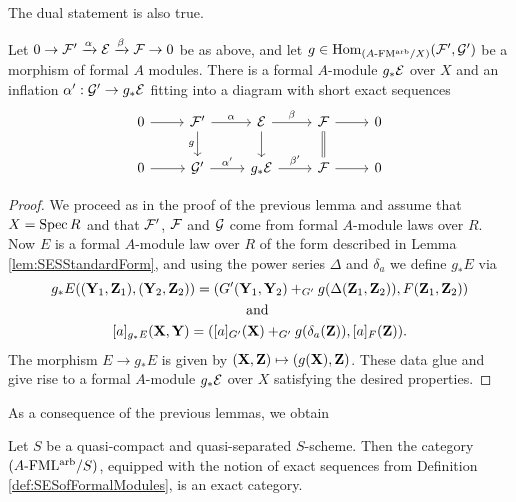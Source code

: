 \documentclass[../main.tex]{subfiles}
\begin{document}
The dual statement is also true. 
\begin{lem}
  Let $0 \to \mathcal{F}' \xrightarrow{\alpha} \mathcal{E} \xrightarrow{\beta} \mathcal{F} \to 0$ be as above, and let
  $g \in \operatorname{Hom}_{{({A}\text-\allowbreak\mathrm{FM^{arb}}/{X})}}(\mathcal{F}', \mathcal{G}')$ be a morphism of formal 
  $A$ modules. There is a formal $A$-module $g_*\mathcal{E}$ over $X$ and an
  inflation $\alpha':\mathcal{G}' \to g_*\mathcal{E}$ fitting into a diagram with short 
  exact sequences
  \begin{equation*}
    \begin{tikzcd}[ampersand replacement=\&]
    	0 \& {\cF'} \& \cE \& \cF \& 0 \\
    	0 \& {\cG'} \& {g_* \cE} \& \cF \& 0
    	\arrow[from=1-1, to=1-2]
    	\arrow["\alpha", from=1-2, to=1-3]
    	\arrow["g"', from=1-2, to=2-2]
    	\arrow["\beta", from=1-3, to=1-4]
    	\arrow[from=1-3, to=2-3]
    	\arrow[from=1-4, to=1-5]
    	\arrow[Rightarrow, no head, from=1-4, to=2-4]
    	\arrow[from=2-1, to=2-2]
    	\arrow["{\alpha'}", from=2-2, to=2-3]
    	\arrow["{\beta'}", from=2-3, to=2-4]
    	\arrow[from=2-4, to=2-5]
    \end{tikzcd}
  \end{equation*}
\begin{proof}
  We proceed as in the proof of the previous lemma and assume that 
  $X = \operatorname{Spec} R$ and that $\mathcal{F}'$, $\mathcal{F}$ and $\mathcal{G}$ come from formal $A$-module
  laws over $R$. Now $E$ is a formal $A$-module law over $R$ of the form 
  described in Lemma \ref{lem:SESStandardForm}, and 
  using the power series $\Delta$ and $\delta_a$ we define $g_* E$ via 
  \begin{gather*}
    g_*E((\mathbf{Y}_1, \mathbf{Z}_1), (\mathbf{Y}_2, \mathbf{Z}_2)) = (G'(\mathbf{Y}_1, \mathbf{Y}_2) +_{G'}
    g(\Delta(\mathbf{Z}_1, \mathbf{Z}_2)) , F(\mathbf{Z}_1, \mathbf{Z}_2)) \\
    \text{and } \\
    [a]_{g_*E}(\mathbf{X}, \mathbf{Y}) = ([a]_{G'}(\mathbf{X}) +_{G'} g(\delta_a(\mathbf{Z})), [a]_F(\mathbf{Z})).
  \end{gather*}
  The morphism $E \to g_*E$ is given by $(\mathbf{X}, \mathbf{Z}) \mapsto (g(\mathbf{X}), \mathbf{Z})$. 
  These data glue and give rise to a formal $A$-module
  $g_*\mathcal{E}$ over $X$ satisfying the desired properties.
\end{proof}
\end{lem}

As a consequence of the previous lemmas, we obtain
\begin{prop}\label{prop:FMArbIsExact}
  Let $S$ be a quasi-compact and quasi-separated $S$-scheme. Then
  the category ${({A}\text-\allowbreak\mathrm{FML^{arb}}/{S})}$, equipped with the notion of exact sequences
  from Definition \ref{def:SESofFormalModules}, is an exact category. 
\end{prop}
\end{document}
